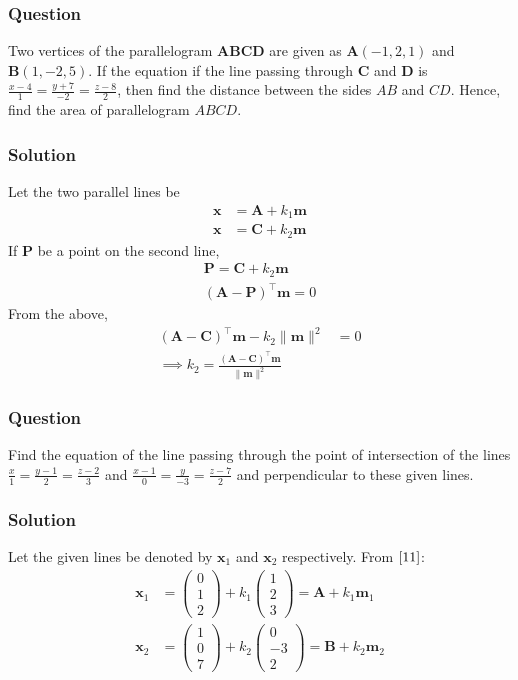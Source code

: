 \documentclass{beamer}
\providecommand{\brak}[1]{\ensuremath{\left(#1\right)}}
\theoremstyle{remark}
\providecommand{\norm}[1]{\lVert#1\rVert}
\newcommand{\myvec}[1]{\ensuremath{\begin{pmatrix}#1\end{pmatrix}}}
\let\vec\mathbf
\begin{document}
\begin{frame}
\frametitle{Question }
Two vertices of the parallelogram $\vec{ABCD}$ are given as $\vec{A}\brak{-1,2,1}$ and $\vec{B}\brak{1,-2,5}$. If the equation if the line passing through $\vec{C}$ and $\vec{D}$ is $\frac{x-4}{1} = \frac{y+7}{-2} = \frac{z-8}{2}$, then find the distance between the sides ${AB}$ and ${CD}$. Hence, find the area of parallelogram ${ABCD}$.
\end{frame}
%
\begin{frame}
\frametitle{Solution}
Let  the two parallel lines be
\begin{align}
    \vec{x} & = \vec{A} + k_1\vec{m}  \\
    \vec{x} &=  \vec{C} + k_2\vec{m} 
\end{align}
If $\vec{P}$ be a point on the second line, 
\begin{align}
    \vec{P} =  \vec{C} + k_2\vec{m} 
    \\
	\brak{\vec{A}-\vec{P}}^{\top}\vec{m} = 0
\end{align}
From the above, 
\begin{align}
	\brak{\vec{A}-\vec{C}}^{\top}\vec{m} -k_2\norm{\vec{m}}^2&= 0
	\\
	\implies k_2 = \frac{
		\brak{\vec{A}-\vec{C}}^{\top}\vec{m}}{ \norm{\vec{m}}^2}
\end{align}
    
\end{frame}
%
\begin{frame}
\frametitle{Question }
Find the equation of the line passing through the point of intersection of the lines $\frac{x}{1} = \frac{y-1}{2} = \frac{z-2}{3}$ and $\frac{x-1}{0} = \frac{y}{-3} = \frac{z-7}{2}$ and perpendicular to these given lines. 
\end{frame}
%
\begin{frame}
\frametitle{Solution}
Let the given lines be denoted by $\vec{x}_1$ and $\vec{x}_2$ respectively. From $\eqref{11}$:
\begin{align}
    \vec{x}_1 &= \myvec{
        0\\
        1\\
        2
    } + k_1\myvec{
        1\\
        2\\
        3
    } = \vec{A} + k_1\vec{m}_1 \label{12} \\
    \vec{x}_2 &= \myvec{
        1\\
        0\\
        7
    } + k_2\myvec{
        0\\
        -3\\
        2
    } = \vec{B} + k_2\vec{m}_2 \label{13}
\end{align}
\end{frame}
\end{document}
